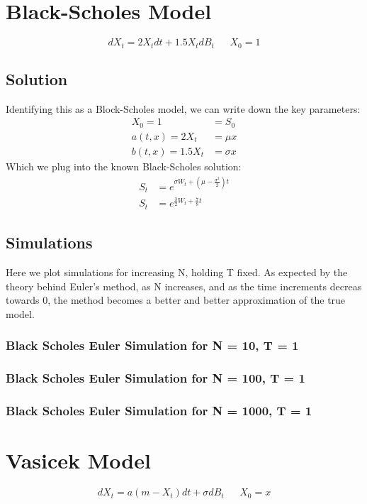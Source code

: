\documentclass[a4paper,12pt]{article}
\begin{document}
\section{Black-Scholes Model}
$$
dX_t = 2X_tdt + 1.5X_tdB_t \ \ \ \ \ \ \ X_0 = 1
$$
%
\subsection*{Solution}
Identifying this as a Block-Scholes model, we can write down the key parameters:
\begin{align*}
X_0 = 1 &= S_0 \\
a(t, x) = 2X_t &= \mu x \\
b(t, x) = 1.5X_t &= \sigma x
\end{align*}
%
Which we plug into the known Black-Scholes solution:
%
\begin{align*}
S_t &= e^{\sigma W_t + (\mu - \frac{\sigma^2}{2})t} \\
S_t &= e^{\frac{3}{2}W_t + \frac{7}{8}t}
\end{align*}
\subsection*{Simulations}
Here we plot simulations for increasing N, holding T fixed. As expected by the theory behind Euler's method, as N increases, and as the time increments decreas towards 0, the method becomes a better and better approximation of the true model.
\subsubsection*{Black Scholes Euler Simulation for N = 10, T = 1}

\subsubsection*{Black Scholes Euler Simulation for N = 100, T = 1}

\subsubsection*{Black Scholes Euler Simulation for N = 1000, T = 1}
\section{Vasicek Model}
$$
dX_t = a(m - X_t)dt + \sigma dB_t \ \ \ \ \ \ \ X_0 = x
$$
%
\end{document}
